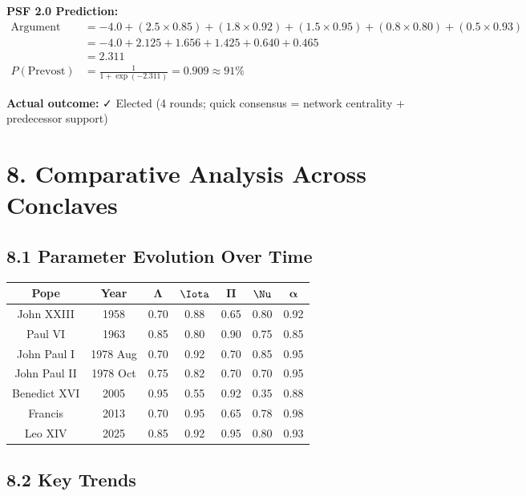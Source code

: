 \textbf{PSF 2.0 Prediction:}
\begin{align*}
\text{Argument} &= -4.0 + (2.5 \times 0.85) + (1.8 \times 0.92) + (1.5 \times 0.95) + (0.8 \times 0.80) + (0.5 \times 0.93) \\
&= -4.0 + 2.125 + 1.656 + 1.425 + 0.640 + 0.465 \\
&= 2.311 \\
P(\text{Prevost}) &= \frac{1}{1 + \exp(-2.311)} = 0.909 \approx 91\%
\end{align*}

\textbf{Actual outcome:} ✓ Elected (4 rounds; quick consensus = network centrality + predecessor support)

\section{8. Comparative Analysis Across Conclaves}

\subsection{8.1 Parameter Evolution Over Time}

\begin{longtable}{|c|c|c|c|c|c|c|}
\hline
\textbf{Pope} & \textbf{Year} & $\boldsymbol{\Lambda}$ & $\boldsymbol{\Iota}$ & $\boldsymbol{\Pi}$ & $\boldsymbol{\Nu}$ & $\boldsymbol{\alpha}$ \\
\hline
\endhead

John XXIII & 1958 & 0.70 & 0.88 & 0.65 & 0.80 & 0.92 \\
Paul VI & 1963 & 0.85 & 0.80 & 0.90 & 0.75 & 0.85 \\
John Paul I & 1978 Aug & 0.70 & 0.92 & 0.70 & 0.85 & 0.95 \\
John Paul II & 1978 Oct & 0.75 & 0.82 & 0.70 & 0.70 & 0.95 \\
Benedict XVI & 2005 & 0.95 & 0.55 & 0.92 & 0.35 & 0.88 \\
Francis & 2013 & 0.70 & 0.95 & 0.65 & 0.78 & 0.98 \\
Leo XIV & 2025 & 0.85 & 0.92 & 0.95 & 0.80 & 0.93 \\
\hline
\end{longtable}

\subsection{8.2 Key Trends}

